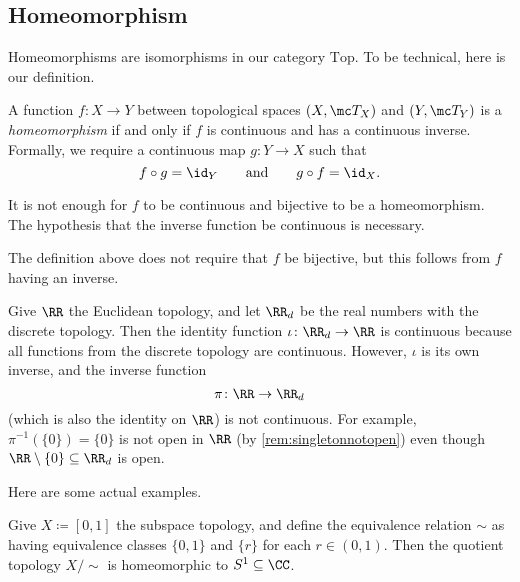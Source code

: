 \documentclass[../notes.tex]{subfiles}
\begin{document}
\subsection{Homeomorphism}
Homeomorphisms are isomorphisms in our category $\mathrm{Top}$. To be technical, here is our definition.
\begin{definition}[Homeomorphism]
	A function $f\colon X\to Y$ between topological spaces $(X,\mc T_X)$ and $(Y,\mc T_Y)$ is a \textit{homeomorphism} if and only if $f$ is continuous and has a continuous inverse. Formally, we require a continuous map $g\colon Y\to X$ such that
	\[f\circ g={\id_Y}\qquad\text{and}\qquad g\circ f={\id_X}.\]
\end{definition}
\begin{warn}
	It is not enough for $f$ to be continuous and bijective to be a homeomorphism. The hypothesis that the inverse function be continuous is necessary.
\end{warn}
\begin{remark}
	The definition above does not require that $f$ be bijective, but this follows from $f$ having an inverse.
\end{remark}
\begin{example}
	Give $\RR$ the Euclidean topology, and let $\RR_d$ be the real numbers with the discrete topology. Then the identity function $\iota\colon\RR_d\to\RR$ is continuous because all functions from the discrete topology are continuous. However, $\iota$ is its own inverse, and the inverse function
	\[\pi\colon\RR\to\RR_d\]
	(which is also the identity on $\RR$) is not continuous. For example, $\pi^{-1}(\{0\})=\{0\}$ is not open in $\RR$ (by \autoref{rem:singletonnotopen}) even though $\RR\setminus\{0\}\subseteq\RR_d$ is open.
\end{example}
Here are some actual examples.
\begin{exe}
	Give $X\coloneqq[0,1]$ the subspace topology, and define the equivalence relation $\sim$ as having equivalence classes $\{0,1\}$ and $\{r\}$ for each $r\in(0,1)$. Then the quotient topology $X/{\sim}$ is homeomorphic to $S^1\subseteq\CC$.
\end{exe}
\end{document}
